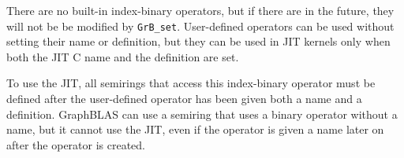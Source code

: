 There are no built-in index-binary operators, but if there are in the future,
they will not be be modified by \verb'GrB_set'.  User-defined operators can be
used without setting their name or definition, but they can be used in JIT
kernels only when both the JIT C name and the definition are set.

To use the JIT, all semirings that access this index-binary operator must
be defined after the user-defined operator has been given both a name and a
definition.  GraphBLAS can use a semiring that uses a binary operator
without a name, but it cannot use the JIT, even if the operator is given a name
later on after the operator is created.


